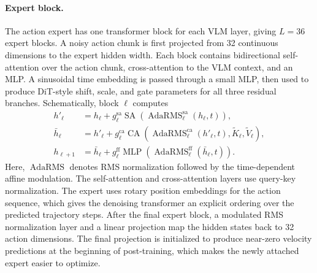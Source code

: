 \paragraph{Expert block.}
The action expert has one transformer block for each VLM layer, giving
\(L=36\) expert blocks. A noisy action chunk is first projected from 32
continuous dimensions to the expert hidden width. Each block contains
bidirectional self-attention over the action chunk, cross-attention to the VLM
context, and an MLP. A sinusoidal time embedding is passed through a small MLP,
then used to produce DiT-style shift, scale, and gate parameters for all three
residual branches. Schematically, block \(\ell\) computes
\begin{align}
    h'_\ell
        &= h_\ell
        + g^{\mathrm{sa}}_\ell
        \operatorname{SA}\!\left(
        \operatorname{AdaRMS}^{\mathrm{sa}}_\ell(h_\ell,t)
        \right), \\
    \bar{h}_\ell
        &= h'_\ell
        + g^{\mathrm{ca}}_\ell
        \operatorname{CA}\!\left(
        \operatorname{AdaRMS}^{\mathrm{ca}}_\ell(h'_\ell,t),
        \tilde{K}_\ell,
        \tilde{V}_\ell
        \right), \\
    h_{\ell+1}
        &= \bar{h}_\ell
        + g^{\mathrm{ff}}_\ell
        \operatorname{MLP}\!\left(
        \operatorname{AdaRMS}^{\mathrm{ff}}_\ell(\bar{h}_\ell,t)
        \right).
\end{align}
Here, \(\operatorname{AdaRMS}\) denotes RMS normalization followed by the
time-dependent affine modulation. The self-attention and cross-attention layers
use query-key normalization. The expert uses rotary position embeddings for the
action sequence, which gives the denoising transformer an explicit ordering
over the predicted trajectory steps. After the final expert block, a modulated
RMS normalization layer and a linear projection map the hidden states back to
32 action dimensions. The final projection is initialized to produce near-zero
velocity predictions at the beginning of post-training, which makes the newly
attached expert easier to optimize.

